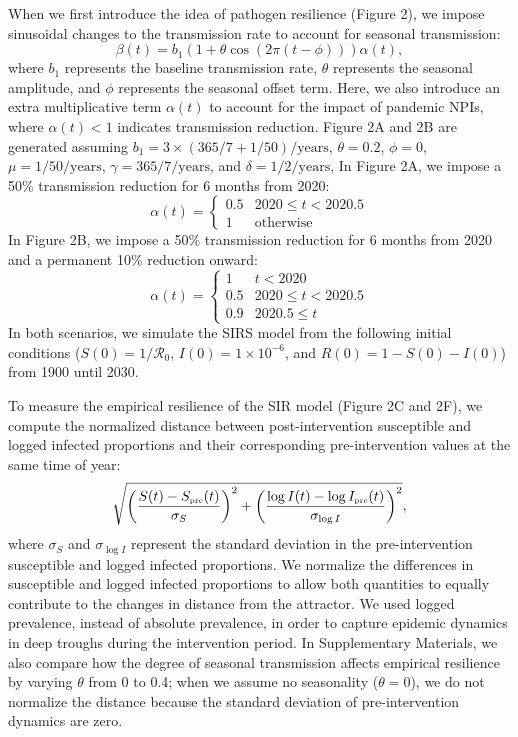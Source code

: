 \documentclass[12pt]{article}
\newcommand{\tsub}[2]{#1_{{\textrm{\tiny #2}}}}
\begin{document}
When we first introduce the idea of pathogen resilience (Figure 2), we impose sinusoidal changes to the transmission rate to account for seasonal transmission:
\begin{equation}
\beta(t) = b_1 (1 + \theta \cos(2 \pi (t-\phi))) \alpha(t),
\end{equation}
where $b_1$ represents the baseline transmission rate, $\theta$ represents the seasonal amplitude, and $\phi$ represents the seasonal offset term.
Here, we also introduce an extra multiplicative term $\alpha(t)$ to account for the impact of pandemic NPIs, where $\alpha(t) < 1$ indicates transmission reduction.
Figure 2A and 2B are generated assuming $b_1 = 3 \times (365/7+1/50)/\mathrm{years}$, $\theta=0.2$, $\phi=0$, $\mu=1/50/\mathrm{years}$, $\gamma=365/7/\mathrm{years}$, and $\delta=1/2/\mathrm{years}$,
In Figure 2A, we impose a 50\% transmission reduction for 6 months from 2020:
\begin{equation}
\alpha(t) = \begin{cases}
0.5 & 2020 \leq t< 2020.5\\
1 & \textrm{otherwise}
\end{cases}
\end{equation}
In Figure 2B, we impose a 50\% transmission reduction for 6 months from 2020 and a permanent 10\% reduction onward:
\begin{equation}
\alpha(t) = \begin{cases}
1 & t < 2020\\
0.5 & 2020 \leq t < 2020.5\\
0.9 & 2020.5 \leq t
\end{cases}
\end{equation}
In both scenarios, we simulate the SIRS model from the following initial conditions ($S(0) = 1/\mathcal R_0$, $I(0) = 1\times 10^{-6}$, and $R(0) = 1 - S(0) - I(0)$) from 1900 until 2030.

To measure the empirical resilience of the SIR model (Figure 2C and 2F), we compute the normalized distance between post-intervention susceptible and logged infected proportions and their corresponding pre-intervention values at the same time of year:
\begin{equation}
\sqrt{\left(\frac{S(t) - \tsub{S}{pre}(t)}{\sigma_S}\right)^2 + \left(\frac{\log I(t) - \log \tsub{I}{pre}(t)}{\sigma_{\log I}}\right)^2},
\end{equation}
where $\sigma_S$ and $\sigma_{\log I}$ represent the standard deviation in the pre-intervention susceptible and logged infected proportions.
We normalize the differences in susceptible and logged infected proportions to allow both quantities to equally contribute to the changes in distance from the attractor.
We used logged prevalence, instead of absolute prevalence, in order to capture epidemic dynamics in deep troughs during the intervention period.
In Supplementary Materials, we also compare how the degree of seasonal transmission affects empirical resilience by varying $\theta$ from 0 to 0.4; when we assume no seasonality ($\theta = 0$), we do not normalize the distance because the standard deviation of pre-intervention dynamics are zero. 
\end{document}
